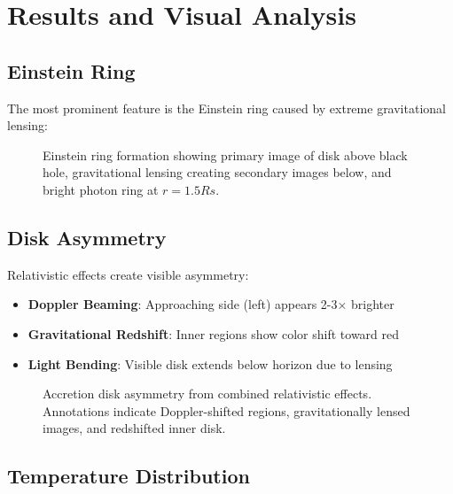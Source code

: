 \documentclass[12pt,a4paper]{article}
\theoremstyle{definition}
\theoremstyle{remark}
\begin{document}
\section{Results and Visual Analysis}

\subsection{Einstein Ring}

The most prominent feature is the Einstein ring caused by extreme gravitational lensing:

\begin{figure}[H]
    \centering
    \caption{Einstein ring formation showing primary image of disk above black hole, gravitational lensing creating secondary images below, and bright photon ring at $r = 1.5Rs$.}
    \label{fig:einstein_ring}
\end{figure}

\subsection{Disk Asymmetry}

Relativistic effects create visible asymmetry:

\begin{itemize}
    \item \textbf{Doppler Beaming}: Approaching side (left) appears 2-3× brighter
    \item \textbf{Gravitational Redshift}: Inner regions show color shift toward red
    \item \textbf{Light Bending}: Visible disk extends below horizon due to lensing
\end{itemize}

\begin{figure}[H]
    \centering
    \caption{Accretion disk asymmetry from combined relativistic effects. Annotations indicate Doppler-shifted regions, gravitationally lensed images, and redshifted inner disk.}
    \label{fig:disk_asymmetry}
\end{figure}

\subsection{Temperature Distribution}
\end{document}

